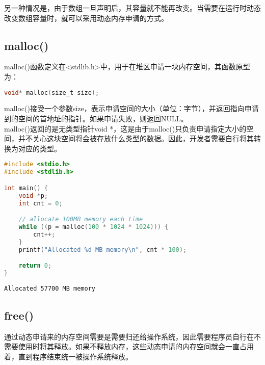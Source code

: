 另一种情况是，由于数组一旦声明后，其容量就不能再改变。当需要在运行时动态改变数组容量时，就可以采用动态内存申请的方式。\\

\subsection{malloc()}

malloc()函数定义在<stdlib.h>中，用于在堆区申请一块内存空间，其函数原型为：

\vspace{-0.5cm}

\begin{lstlisting}[language=C]
void* malloc(size_t size);
\end{lstlisting}

malloc()接受一个参数size，表示申请空间的大小（单位：字节），并返回指向申请到的空间的首地址的指针。如果申请失败，则返回NULL。\\

malloc()返回的是无类型指针void *，这是由于malloc()只负责申请指定大小的空间，并不关心这块空间将会被存放什么类型的数据。因此，开发者需要自行将其转换为对应的类型。\\


\begin{lstlisting}[language=C]
#include <stdio.h>
#include <stdlib.h>

int main() {
    void *p;
    int cnt = 0;

    // allocate 100MB memory each time
    while ((p = malloc(100 * 1024 * 1024))) {
        cnt++;
    }
    printf("Allocated %d MB memory\n", cnt * 100);

    return 0;
}
\end{lstlisting}

\begin{tcolorbox}
    \begin{verbatim}
Allocated 57700 MB memory
	\end{verbatim}
\end{tcolorbox}

\vspace{0.5cm}

\subsection{free()}

通过动态申请来的内存空间需要是需要归还给操作系统，因此需要程序员自行在不需要使用时将其释放。如果不释放内存，这些动态申请的内存空间就会一直占用着，直到程序结束统一被操作系统释放。\\

